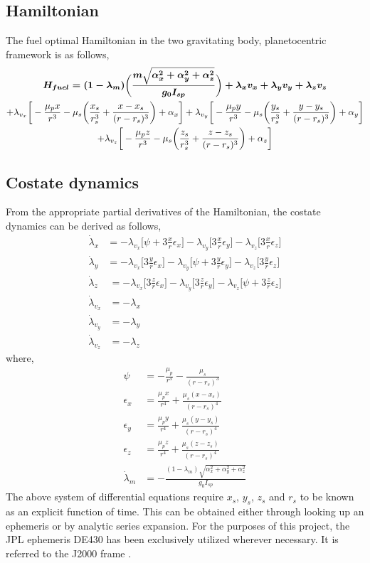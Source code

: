 \subsection{Hamiltonian}
The fuel optimal Hamiltonian in the two gravitating body, planetocentric framework is as follows,
\begin{multline}
	\boldmath{H_{fuel}}=(1-\lambda_m)\bigg(\frac{m\sqrt{\alpha_x^2+\alpha_y^2+\alpha_z^2}}{g_0 I_{sp}}\bigg)+\lambda_x v_x+\lambda_y v_y+\lambda_z v_z\\
	+\lambda_{v_x}\bigg[-\frac{\mu_p x}{r^3}-\mu_s\bigg(\frac{x_s}{r_s^3}+\frac{x-x_s}{(r-r_s)^3}\bigg)+\alpha_x\bigg]+\lambda_{v_y}\bigg[-\frac{\mu_p y}{r^3}-\mu_s\bigg(\frac{y_s}{r_s^3}+\frac{y-y_s}{(r-r_s)^3}\bigg)+\alpha_y\bigg]\\
	+\lambda_{v_z}\bigg[-\frac{\mu_p z}{r^3}-\mu_s\bigg(\frac{z_s}{r_s^3}+\frac{z-z_s}{(r-r_s)^3}\bigg)+\alpha_z\bigg]
\end{multline}
\subsection{Costate dynamics}
From the appropriate partial derivatives of the Hamiltonian, the costate dynamics can be derived as follows,
\begin{align}
	\dot{\lambda}_x&=-\lambda_{v_x}\bigg[\psi+3\frac{x}{r}\epsilon_x\bigg]-\lambda_{v_y}\bigg[3\frac{x}{r}\epsilon_y\bigg]-\lambda_{v_z}\bigg[3\frac{x}{r}\epsilon_z\bigg]\\
	\dot{\lambda}_y&=-\lambda_{v_x}\bigg[3\frac{y}{r}\epsilon_x\bigg]-\lambda_{v_y}\bigg[\psi+3\frac{y}{r}\epsilon_y\bigg]-\lambda_{v_z}\bigg[3\frac{y}{r}\epsilon_z\bigg]
\end{align}
\begin{align}
	\dot{\lambda}_z&=-\lambda_{v_x}\bigg[3\frac{z}{r}\epsilon_x\bigg]-\lambda_{v_y}\bigg[3\frac{z}{r}\epsilon_y\bigg]-\lambda_{v_z}\bigg[\psi+3\frac{z}{r}\epsilon_z\bigg]\\
	\dot{\lambda}_{v_x}&=-\lambda_x\\
	\dot{\lambda}_{v_y}&=-\lambda_y\\
	\dot{\lambda}_{v_z}&=-\lambda_z
\end{align}
where,
\begin{align}
	\psi&=-\frac{\mu_p}{r^3}-\frac{\mu_s}{(r-r_s)^3}\\
	\epsilon_x&=\frac{\mu_p x}{r^4}+\frac{\mu_s (x-x_s)}{(r-r_s)^4}\\
	\epsilon_y&=\frac{\mu_p y}{r^4}+\frac{\mu_s (y-y_s)}{(r-r_s)^4}\\
	\epsilon_z&=\frac{\mu_p z}{r^4}+\frac{\mu_s (z-z_s)}{(r-r_s)^4}\\
	\dot{\lambda}_m&=-\frac{(1-\lambda_m)\sqrt{\alpha_x^2+\alpha_y^2+\alpha_z^2}}{g_0 I_{sp}}
\end{align}
The above system of differential equations require $x_s$, $y_s$, $z_s$ and $r_s$ to be known as an explicit function of time. This can be obtained either through looking up an ephemeris or by analytic series expansion. For the purposes of this project, the JPL ephemeris DE430 \citep{folkner2014planetary} has been exclusively utilized wherever necessary. It is referred to the J2000 frame \citep{standish1982orientation}.


